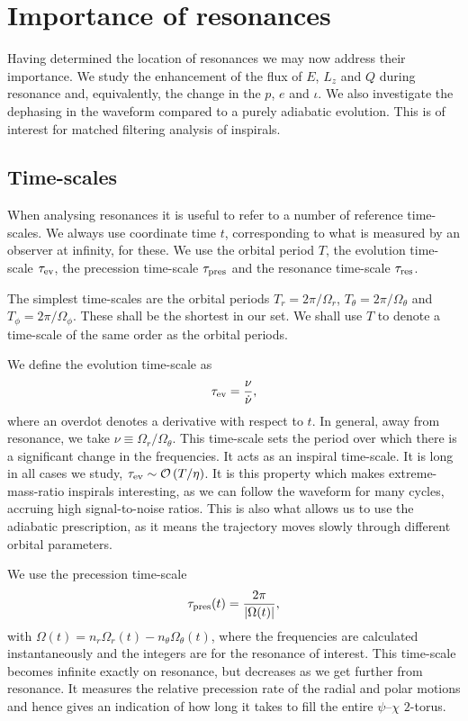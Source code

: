 \section{Importance of resonances}

Having determined the location of resonances we may now address their importance. We study the enhancement of the flux of $E$, $L_z$ and $Q$ during resonance and, equivalently, the change in the $p$, $e$ and $\iota$. We also investigate the dephasing in the waveform compared to a purely adiabatic evolution. This is of interest for matched filtering analysis of inspirals.

\subsection{Time-scales}

When analysing resonances it is useful to refer to a number of reference time-scales. We  always use coordinate time $t$, corresponding to what is measured by an observer at infinity, for these. We use the orbital period $T$, the evolution time-scale $\tau_\mathrm{ev}$, the precession time-scale $\tau_\mathrm{pres}$ and the resonance time-scale $\tau_\mathrm{res}$.

The simplest time-scales are the orbital periods $T_r = 2\pi/\Omega_r$, $T_\theta = 2\pi/\Omega_\theta$ and $T_\phi = 2\pi/\Omega_\phi$. These shall be the shortest in our set. We shall use $T$ to denote a time-scale of the same order as the orbital periods.

We define the evolution time-scale as
\begin{equation}
\tau_\mathrm{ev} = \dfrac{\nu}{\dot{\nu}},
\end{equation}
where an overdot denotes a derivative with respect to $t$. In general, away from resonance, we take $\nu \equiv \Omega_r/\Omega_\theta$. This time-scale sets the period over which there is a significant change in the frequencies. It acts as an inspiral time-scale. It is long in all cases we study, $\tau_\mathrm{ev} \sim \mathcal{O}\left({T/\eta}\right)$. It is this property which makes extreme-mass-ratio inspirals interesting, as we can follow the waveform for many cycles, accruing high signal-to-noise ratios. This is also what allows us to use the adiabatic prescription, as it means the trajectory moves slowly through different orbital parameters.

We use the precession time-scale
\begin{equation}
\tau_\mathrm{pres}(t) = \dfrac{2\pi}{|\Omega(t)|},
\label{eq:t-pres}
\end{equation}
with $\Omega(t) = n_r \Omega_r(t) - n_\theta \Omega_\theta(t)$, where the frequencies are calculated instantaneously and the integers are for the resonance of interest. This time-scale becomes infinite exactly on resonance, but decreases as we get further from resonance. It measures the relative precession rate of the radial and polar motions and hence gives an indication of how long it takes to fill the entire $\psi$--$\chi$ $2$-torus.

